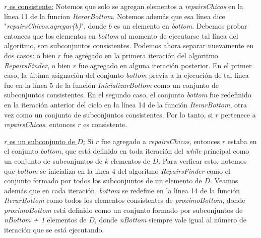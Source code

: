 \documentclass[11pt,a4paper,twoside]{tesis}
\begin{document}
\underline{$r$ es consistente:} Notemos que solo se agregan elementos a \textit{repairsChicos} en la línea 11 de la funcion \textit{IterarBottom}. Notemos además que esa línea dice "\textit{repairsChicos.agregar(b)}", donde $b$ es un elemento en \textit{bottom}. Debemos probar entonces que los elementos en \textit{bottom} al momento de ejecutarse tal línea del algoritmo, son subconjuntos consistentes. Podemos ahora separar nuevamente en dos casos: o bien $r$ fue agregado en la primera iteración del algoritmo \textit{RepairsFinder}, o bien $r$ fue agregado en alguna iteración posterior. En el primer caso, la última asignación del conjunto \textit{bottom} previa a la ejecución de tal línea fue en la línea 5 de la función \textit{InicializarBottom} como un conjunto de subconjuntos consistentes. En el segundo caso, el conjunto \textit{bottom} fue redefinido en la iteración anterior del ciclo en la línea 14 de la función \textit{IterarBottom}, otra vez como un conjunto de subconjuntos consistentes. Por lo tanto, si $r$ pertenece a \textit{repairsChicos}, entonces $r$ es consistente.

\underline{$r$ es un subconjunto de $D$:} Si $r$ fue agregado a \textit{repairsChicos}, entonces $r$ estaba en el conjunto \textit{bottom}, que está definido en toda iteración del \textit{while} principal como un conjunto de subconjuntos de $k$ elementos de $D$. Para verficar esto, notemos que \textit{bottom} se inicializa en la línea 4 del algoritmo \textit{RepairsFinder} como el conjunto formado por todos los subconjuntos de un elemento de $D$. Veamos además que en cada iteración, \textit{bottom} se redefine en la línea 14 de la función \textit{IterarBottom} como todos los elementos consistentes de \textit{proximoBottom}, donde \textit{proximoBottom} está definido como un conjunto formado por subconjuntos de \textit{nBottom + 1} elementos de $D$, donde \textit{nBottom} siempre vale igual al número de iteración que se está ejecutando.
\end{document}
